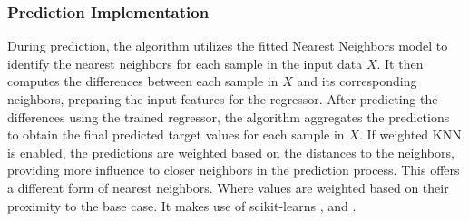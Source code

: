 \documentclass[a4paper, 12pt]{report}
\begin{document}
\subsubsection{Prediction Implementation}
During prediction, the algorithm utilizes the fitted Nearest Neighbors model to identify the nearest neighbors for each sample in the input data $X$. 
It then computes the differences between each sample in $X$ and its corresponding neighbors, 
preparing the input features for the regressor. After predicting the differences using the trained regressor, 
the algorithm aggregates the predictions to obtain the final predicted target values for each sample in $X$.
If weighted KNN is enabled, the predictions are weighted based on the distances to the neighbors, 
providing more influence to closer neighbors in the prediction process. 
This offers a different form of nearest neighbors. Where values are weighted based on their proximity to the base case.
It makes use of scikit-learns \cite{scikit-learn} , and .
\end{document}
